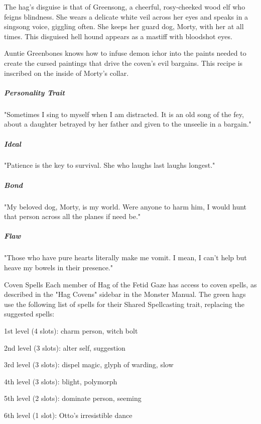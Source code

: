 \documentclass[10pt,a4paper,twoside,bg=print,twocolumn,openany,nodeprecatedcode]{dndbook}
\begin{document}
The hag's disguise is that of Greensong, a cheerful, rosy-cheeked wood elf who feigns blindness. She wears a delicate white veil across her eyes and speaks in a singsong voice, giggling often. She keeps her guard dog, Morty, with her at all times. This disguised hell hound appears as a mastiff with bloodshot eyes.

Auntie Greenbones knows how to infuse demon ichor into the paints needed to create the cursed paintings that drive the coven's evil bargains. This recipe is inscribed on the inside of Morty's collar.

\subparagraph{Personality Trait}
"Sometimes I sing to myself when I am distracted. It is an old song of the fey, about a daughter betrayed by her father and given to the unseelie in a bargain."

\subparagraph{Ideal}
"Patience is the key to survival. She who laughs last laughs longest."

\subparagraph{Bond}
"My beloved dog, Morty, is my world. Were anyone to harm him, I would hunt that person across all the planes if need be."

\subparagraph{Flaw}
"Those who have pure hearts literally make me vomit. I mean, I can't help but heave my bowels in their presence."

\begin{DndSidebar}[float=!b]{Coven Spells}
Each member of Hag of the Fetid Gaze has access to coven spells, as described in the "Hag Covens" sidebar in the Monster Manual. The green hags use the following list of spells for their Shared Spellcasting trait, replacing the suggested spells:



1st level (4 slots): charm person, witch bolt



2nd level (3 slots): alter self, suggestion



3rd level (3 slots): dispel magic, glyph of warding, slow



4th level (3 slots): blight, polymorph



5th level (2 slots): dominate person, seeming



6th level (1 slot): Otto's irresistible dance



\end{DndSidebar}
\end{document}

